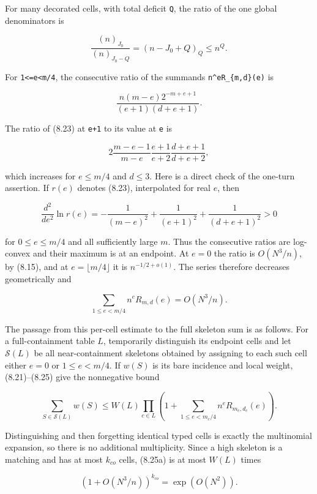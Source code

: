 \documentclass[
  11pt,
  a4paper,
]{article}
\begin{document}
For many decorated cells, with total deficit \texttt{Q}, the ratio of
the one global denominators is

\[
 \frac{(n)_{J_0}}{(n)_{J_0-Q}}
 =(n-J_0+Q)_Q\le n^Q.                                   \tag{8.22}
\]

For \texttt{1\textless{}=e\textless{}m/4}, the consecutive ratio of the
summands \texttt{n\^{}eR\_\{m,d\}(e)} is

\[
 \frac{n(m-e)2^{-m+e+1}}{(e+1)(d+e+1)}.                 \tag{8.23}
\]

The ratio of (8.23) at \texttt{e+1} to its value at \texttt{e} is

\[
 2\frac{m-e-1}{m-e}\frac{e+1}{e+2}
  \frac{d+e+1}{d+e+2},                                  \tag{8.24}
\]

which increases for \(e\le m/4\) and \(d\le3\). Here is a direct check
of the one-turn assertion. If \(r(e)\) denotes (8.23), interpolated for
real \(e\), then

\[
 \frac{d^2}{de^2}\ln r(e)
 =-\frac1{(m-e)^2}+\frac1{(e+1)^2}
   +\frac1{(d+e+1)^2}>0                                  \tag{8.24a}
\]

for \(0\le e\le m/4\) and all sufficiently large \(m\). Thus the
consecutive ratios are log-convex and their maximum is at an endpoint.
At \(e=0\) the ratio is \(O(N^3/n)\), by (8.15), and at
\(e=\lfloor m/4\rfloor\) it is \(n^{-1/2+o(1)}\). The series therefore
decreases geometrically and

\[
 \sum_{1\le e<m/4}n^eR_{m,d}(e)=O(N^3/n).                \tag{8.25}
\]

The passage from this per-cell estimate to the full skeleton sum is as
follows. For a full-containment table \(L\), temporarily distinguish its
endpoint cells and let \(\mathcal S(L)\) be all near-containment
skeletons obtained by assigning to each such cell either \(e=0\) or
\(1\le e<m/4\). If \(w(S)\) is its bare incidence and local weight,
(8.21)--(8.25) give the nonnegative bound

\[
 \sum_{S\in\mathcal S(L)}w(S)
 \le W(L)\prod_{c\in L}
   \left(1+\sum_{1\le e<m_c/4}n^eR_{m_c,d_c}(e)\right).
                                                               \tag{8.25a}
\]

Distinguishing and then forgetting identical typed cells is exactly the
multinomial expansion, so there is no additional multiplicity. Since a
high skeleton is a matching and has at most \(k_{co}\) cells, (8.25a) is
at most \(W(L)\) times

\[
 (1+O(N^3/n))^{k_{co}}=\exp(O(N^2)).                     \tag{8.26}
\]
\end{document}
